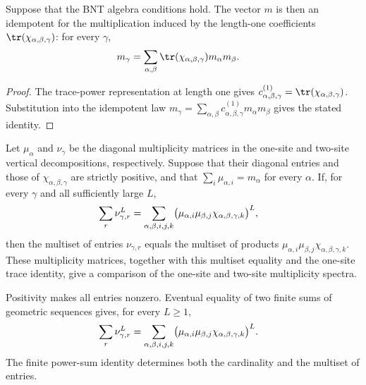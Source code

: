 \begin{lemma}%
    \label{lem:mpdo_bnt_idempotent_coefficient_form_of_chi}
    \leanok
    Suppose that the BNT algebra conditions hold. The vector $m$ is then an
    idempotent for the multiplication induced by the length-one
    coefficients $\tr(\chi_{\alpha,\beta,\gamma})$: for every $\gamma$,
    \begin{align}
        m_\gamma
         & =\sum_{\alpha,\beta}
        \tr(\chi_{\alpha,\beta,\gamma})
        m_\alpha m_\beta.
        \notag
    \end{align}
\end{lemma}

\begin{proof}\leanok
    The trace-power representation at length one gives
    $c^{(1)}_{\alpha,\beta,\gamma}
        =\tr(\chi_{\alpha,\beta,\gamma})$.
    Substitution into the idempotent law
    $m_\gamma
        =\sum_{\alpha,\beta}
        c^{(1)}_{\alpha,\beta,\gamma}m_\alpha m_\beta$
    gives the stated identity.
\end{proof}

\begin{definition}%
    \label{def:mpdo_bnt_eventual_power_sums_multiplicity_comparison}
    \leanok
    Let $\mu_\alpha$ and $\nu_\gamma$ be the diagonal multiplicity matrices
    in the one-site and two-site vertical decompositions, respectively.
    Suppose that their diagonal entries and those of
    $\chi_{\alpha,\beta,\gamma}$ are strictly positive, and that
    $\sum_i\mu_{\alpha,i}=m_\alpha$ for every $\alpha$.
    If, for every $\gamma$ and all sufficiently large $L$,
    \begin{align}
        \sum_r \nu_{\gamma,r}^{L}
         & =
        \sum_{\alpha,\beta,i,j,k}
        \bigl(\mu_{\alpha,i}\mu_{\beta,j}
        \chi_{\alpha,\beta,\gamma,k}\bigr)^L,
        \notag
    \end{align}
    then the multiset of entries $\nu_{\gamma,r}$ equals the multiset of
    products $\mu_{\alpha,i}\mu_{\beta,j}\chi_{\alpha,\beta,\gamma,k}$.
    These multiplicity matrices, together with this multiset equality and
    the one-site trace identity, give a comparison of the one-site and
    two-site multiplicity spectra.

    Positivity makes all entries nonzero. Eventual equality of two finite
    sums of geometric sequences gives, for every $L\geq 1$,
    \begin{align}
        \sum_r \nu_{\gamma,r}^{L}
         & =
        \sum_{\alpha,\beta,i,j,k}
        \bigl(\mu_{\alpha,i}\mu_{\beta,j}
        \chi_{\alpha,\beta,\gamma,k}\bigr)^L.
        \notag
    \end{align}
    The finite power-sum identity determines both the cardinality and the
    multiset of entries.
\end{definition}

